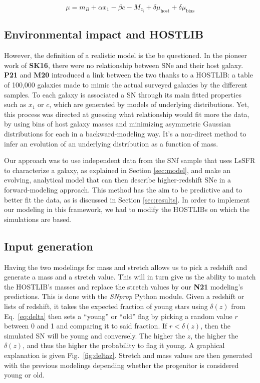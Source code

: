 \documentclass[]{aa}
\begin{document}
\begin{equation}\label{eq:mu}
    \mu = m_B + \alpha x_1 - \beta c - M_{z_i} + \delta\mu _\mathrm{host} +
    \delta\mu _\mathrm{bias}
\end{equation}

\subsection{Environmental impact and HOSTLIB}
However, the definition of a realistic model is the be questioned. In the
pioneer work of \textbf{SK16}, there were no relationship between SNe and their
host galaxy. \textbf{P21} and \textbf{M20} introduced a link between the two
thanks to a HOSTLIB: a table of 100,000 galaxies made to mimic the actual
surveyed galaxies by the different samples. To each galaxy is associated a SN
through its main fitted properties such as $x_1$ or $c$, which are generated by
models of underlying distributions. Yet, this process was directed at guessing
what relationship would fit more the data, by using bins of host galaxy masses
and minimizing asymmetric Gaussian distributions for each in a backward-modeling
way. It's a non-direct method to infer an evolution of an underlying
distribution as a function of mass.

Our approach was to use independent data from the SNf sample that uses LsSFR to
characterize a galaxy, as explained in Section \ref{sec:model}, and make an
evolving, analytical model that can then describe higher-redshift SNe in a
forward-modeling approach. This method has the aim to be predictive and to
better fit the data, as is discussed in Section \ref{sec:results}. In order to
implement our modeling in this framework, we had to modify the HOSTLIBs on which
the simulations are based.

\subsection{Input generation}\label{ssec:inpgen}

Having the two modelings for mass and stretch allows us to pick a redshift and
generate a mass and a stretch value. This will in turn give us the ability to
match the HOSTLIB's masses and replace the stretch values by our \textbf{N21}
modeling's predictions. This is done with the \textit{SNprop} Python
module\footnotemark {}.
Given a redshift or lists of redshift, it takes the expected fraction of young
stars using $\delta(z)$ from Eq.~\ref{eq:delta} then sets a ``young'' or ``old''
flag by picking a random value $r$ between 0 and 1 and comparing it to said
fraction. If $r < \delta(z)$, then the simulated SN will be young and
conversely. The higher the $z$, the higher the $\delta(z)$, and thus the higher
the probability to flag it young. A graphical explanation is given
Fig.~\ref{fig:deltaz}. Stretch and mass values are then generated with the
previous modelings depending whether the progenitor is considered young or old.
\end{document}
